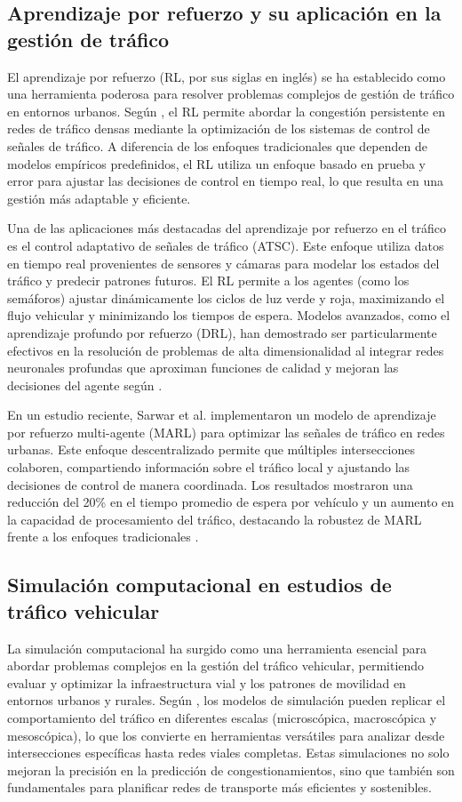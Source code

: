 \subsection{Aprendizaje por refuerzo y su aplicación en la gestión de tráfico}
El aprendizaje por refuerzo (RL, por sus siglas en inglés) se ha establecido como una herramienta poderosa para resolver problemas complejos de gestión de tráfico en entornos urbanos. Según \cite{Greguric2020}, el RL permite abordar la congestión persistente en redes de tráfico densas mediante la optimización de los sistemas de control de señales de tráfico. A diferencia de los enfoques tradicionales que dependen de modelos empíricos predefinidos, el RL utiliza un enfoque basado en prueba y error para ajustar las decisiones de control en tiempo real, lo que resulta en una gestión más adaptable y eficiente.

Una de las aplicaciones más destacadas del aprendizaje por refuerzo en el tráfico es el control adaptativo de señales de tráfico (ATSC). Este enfoque utiliza datos en tiempo real provenientes de sensores y cámaras para modelar los estados del tráfico y predecir patrones futuros. El RL permite a los agentes (como los semáforos) ajustar dinámicamente los ciclos de luz verde y roja, maximizando el flujo vehicular y minimizando los tiempos de espera. Modelos avanzados, como el aprendizaje profundo por refuerzo (DRL), han demostrado ser particularmente efectivos en la resolución de problemas de alta dimensionalidad al integrar redes neuronales profundas que aproximan funciones de calidad y mejoran las decisiones del agente según \cite{Sarwar2023}.

En un estudio reciente, Sarwar et al. implementaron un modelo de aprendizaje por refuerzo multi-agente (MARL) para optimizar las señales de tráfico en redes urbanas. Este enfoque descentralizado permite que múltiples intersecciones colaboren, compartiendo información sobre el tráfico local y ajustando las decisiones de control de manera coordinada. Los resultados mostraron una reducción del 20\% en el tiempo promedio de espera por vehículo y un aumento en la capacidad de procesamiento del tráfico, destacando la robustez de MARL frente a los enfoques tradicionales \cite{Zourbakhsh2022}.

\subsection{Simulación computacional en estudios de tráfico vehicular}
La simulación computacional ha surgido como una herramienta esencial para abordar problemas complejos en la gestión del tráfico vehicular, permitiendo evaluar y optimizar la infraestructura vial y los patrones de movilidad en entornos urbanos y rurales. Según \cite{Alghamdi2022}, los modelos de simulación pueden replicar el comportamiento del tráfico en diferentes escalas (microscópica, macroscópica y mesoscópica), lo que los convierte en herramientas versátiles para analizar desde intersecciones específicas hasta redes viales completas. Estas simulaciones no solo mejoran la precisión en la predicción de congestionamientos, sino que también son fundamentales para planificar redes de transporte más eficientes y sostenibles.


